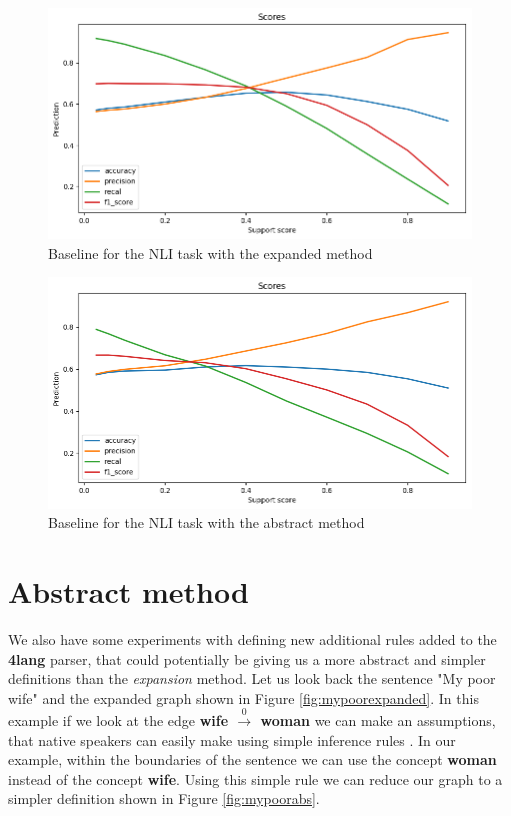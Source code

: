 \begin{figure}
	\centering
	\includegraphics[scale=0.5]{figures/nliexpanded}
	\caption{Baseline for the NLI task with the expanded method}
	\label{fig:nliexpanded}
\end{figure}

\begin{figure}
	\centering
	\includegraphics[scale=0.5]{figures/nliabstract}
	\caption{Baseline for the NLI task with the abstract method}
	\label{fig:nliabstract}
\end{figure}

\section{Abstract method}
We also have some experiments with defining new additional rules added to the \textbf{4lang} parser, that could potentially be giving us a more abstract and simpler definitions than the \textit{expansion} method. Let us look back the sentence "My poor wife" and the expanded graph shown in Figure \ref{fig:mypoorexpanded}. In this example if we look at the edge \textbf{wife $\xrightarrow0$ woman} we can make an assumptions, that native speakers can easily make using simple inference rules \cite{Kovacs:2018}. In our example, within the boundaries of the sentence we can use the concept \textbf{woman} instead of the concept \textbf{wife}. Using this simple rule we can reduce our graph to a simpler definition shown in Figure \ref{fig:mypoorabs}.


